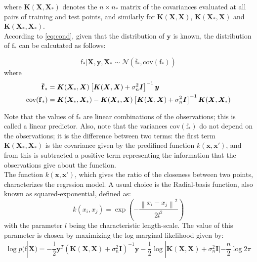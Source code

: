 where $\bm{K}(\bm{X},\bm{X}_*)$ denotes the $n \times n_*$ matrix of the covariances evaluated at all pairs of training and test points, and similarly for $\bm{K}(\bm{X},\bm{X})$, $\bm{K}(\bm{X}_*,\bm{X})$ and $\bm{K}(\bm{X}_*,\bm{X}_*)$. \\

According to \ref{eq:cond}, given that the distribution of $\bm{y}$ is known, the distribution of $\bm{\mathrm{f}_*}$ can be calcutated as follows:

\begin{equation}
  \bm{\mathrm{f}}_* | \bm{X}, \bm{y}, \bm{X}_* \sim \mathcal{N}(\bar{\bm{\mathrm{f}}}_*, \text{cov}(\bm{\mathrm{f}}_*))
\end{equation}
where
\begin{align}
  \bar{\bm{\mathrm{f}}}_* &= \bm{K}(\bm{X}_*,\bm{X}) \left[ \bm{K}(\bm{X},\bm{X})+\sigma_n^2 \bm{I} \right]^{-1}\bm{y} \\
  \text{cov}(\bm{\mathrm{f}}_*) &= \bm{K}(\bm{X}_*,\bm{X}_*) -  \bm{K}(\bm{X}_*,\bm{X}) \left[ \bm{K}(\bm{X},\bm{X})+\sigma_n^2 \bm{I} \right]^{-1} \bm{K}(\bm{X},\bm{X}_*)
\end{align}

Note that the values of $\bar{\bm{\mathrm{f}}}_*$ are linear combinations of the observations; this is called a linear predictor. Also, note that the variances $\text{cov}(\bm{\mathrm{f}}_*)$ do not depend on the observations; it is the difference between two terms: the first term $\bm{K}(\bm{X}_*,\bm{X}_*)$ is the covariance given by the predifined function $k(\bm{x}, \bm{x'})$, and from this is subtracted a positive term representing the information that the observations give about the function. \\

The function $k(\bm{x}, \bm{x'})$, which gives the ratio of the closeness between two points, characterizes the regrssion model. A usual choice is the Radial-basis function, also known as squared-exponential, defined as:
\begin{equation}
  k(x_i, x_j) = \exp{\left(- \frac{\left\lVert x_i - x_j \right\lVert^2}{2l^2}\right) }
\end{equation}
with the parameter $l$ being the characteristic length-scale. The value of this parameter is chosen by maximizing the log marginal likelihood given by:
\begin{equation}
  \log p(\bm{\mathrm{f}}|\bm{X}) = - \frac{1}{2} \bm{y}^T (\bm{K}(\bm{X},\bm{X}) + \sigma_n^2 \bm{I})^{-1} \bm{y} - \frac{1}{2} \log |\bm{K}(\bm{X},\bm{X}) + \sigma_n^2 \bm{I}| - \frac{n}{2} \log 2 \pi
\end{equation}
